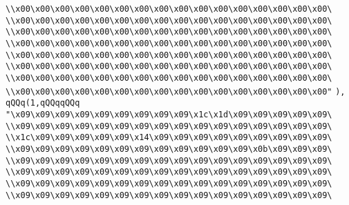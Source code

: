 \verb|\\x00\x00\x00\x00\x00\x00\x00\x00\x00\x00\x00\x00\x00\x00\x00\x00\|\newline
\verb|\\x00\x00\x00\x00\x00\x00\x00\x00\x00\x00\x00\x00\x00\x00\x00\x00\|\newline
\verb|\\x00\x00\x00\x00\x00\x00\x00\x00\x00\x00\x00\x00\x00\x00\x00\x00\|\newline
\verb|\\x00\x00\x00\x00\x00\x00\x00\x00\x00\x00\x00\x00\x00\x00\x00\x00\|\newline
\verb|\\x00\x00\x00\x00\x00\x00\x00\x00\x00\x00\x00\x00\x00\x00\x00\x00\|\newline
\verb|\\x00\x00\x00\x00\x00\x00\x00\x00\x00\x00\x00\x00\x00\x00\x00\x00\|\newline
\verb|\\x00\x00\x00\x00\x00\x00\x00\x00\x00\x00\x00\x00\x00\x00\x00\x00\|\newline
\verb|\\x00\x00\x00\x00\x00\x00\x00\x00\x00\x00\x00\x00\x00\x00\x00\x00"|\newline
\verb|),|\newline
\verb|qQQq(1,qQQqqQQq|\newline
\verb|"\x09\x09\x09\x09\x09\x09\x09\x09\x09\x1c\x1d\x09\x09\x09\x09\x09\|\newline
\verb|\\x09\x09\x09\x09\x09\x09\x09\x09\x09\x09\x09\x09\x09\x09\x09\x09\|\newline
\verb|\\x1c\x09\x09\x09\x09\x09\x14\x09\x09\x09\x09\x09\x09\x09\x09\x09\|\newline
\verb|\\x09\x09\x09\x09\x09\x09\x09\x09\x09\x09\x09\x09\x0b\x09\x09\x09\|\newline
\verb|\\x09\x09\x09\x09\x09\x09\x09\x09\x09\x09\x09\x09\x09\x09\x09\x09\|\newline
\verb|\\x09\x09\x09\x09\x09\x09\x09\x09\x09\x09\x09\x09\x09\x09\x09\x09\|\newline
\verb|\\x09\x09\x09\x09\x09\x09\x09\x09\x09\x09\x09\x09\x09\x09\x09\x09\|\newline
\verb|\\x09\x09\x09\x09\x09\x09\x09\x09\x09\x09\x09\x09\x09\x09\x09\x09\|\newline
